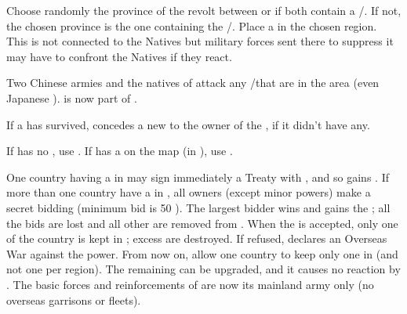 


\phevnt
\aparag Choose randomly the province of the revolt between
\granderegionSingala or \granderegionFormose if both contain a \TP/\COL. If
not, the chosen province is the one containing the \TP/\COL.
\aparag Place a \REVOLT \facemoins in the chosen region. This \REVOLT is not
connected to the Natives but military forces sent there to suppress it may
have to confront the Natives if they react.








\phevnt
\aparag Two Chinese armies and the natives of \granderegionCorea attack any
\TP/\COL that are in the area (even Japanese \TP).
\aparag \granderegionCorea is now part of \paysChina.

\phpaix
\aparag If a \TP has survived,  concedes a new \dipAT to the owner
of the \TP, if it didn't have any.





\condition{}
\aparag If \paysJapon has no \TP, use .
\aparag If \paysJapon has a \TP on the map (in \granderegionCorea), use
.



\phevnt
\aparag One country having a \TP in \paysJapon may sign immediately a Treaty
with \paysJapon, and so gains \dipAT. If more than one country have a \TP in
\paysJapon, all owners (except minor powers) make a secret bidding (minimum
bid is 50 \ducats).  The largest bidder wins and gains the \dipAT; all the
bids are lost and all other \TP are removed from \paysJapon.
\aparag When the \dipAT is accepted, only one \TP of the country is kept in
\paysJapon; excess \TP are destroyed. If refused, \paysJapon declares an
Overseas War against the power.
\aparag From now on, \dipAT allow one country to keep only one \TP in
\paysJapon (and not one per region). The remaining \TP can be upgraded, and it
causes no reaction by \paysJapon.
\aparag The basic forces and reinforcements of \paysJapon are now its mainland
army only (no overseas garrisons or fleets).

